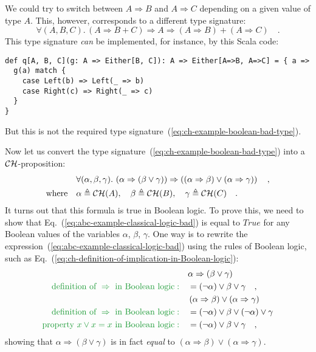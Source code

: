 We could try to switch between $A\Rightarrow B$ and $A\Rightarrow C$
depending on a given value of type $A$. This, however, corresponds
to a different type signature: 
\[
\forall(A,B,C).\,\left(A\Rightarrow B+C\right)\Rightarrow A\Rightarrow\left(A\Rightarrow B\right)+\left(A\Rightarrow C\right)\quad.
\]
This type signature \emph{can} be implemented, for instance, by this
Scala code:
\begin{lstlisting}
def q[A, B, C](g: A => Either[B, C]): A => Either[A=>B, A=>C] = { a =>
  g(a) match {
    case Left(b) => Left(_ => b)
    case Right(c) => Right(_ => c)
  }
}
\end{lstlisting}
But this is not the required type signature~(\ref{eq:ch-example-boolean-bad-type}).

Now let us convert the type signature~(\ref{eq:ch-example-boolean-bad-type})
into a ${\cal CH}$-proposition:
\begin{align}
 & \forall(\alpha,\beta,\gamma).\,\left(\alpha\Rightarrow\left(\beta\vee\gamma\right)\right)\Rightarrow\left(\left(\alpha\Rightarrow\beta\right)\vee\left(\alpha\Rightarrow\gamma\right)\right)\quad,\label{eq:abc-example-classical-logic-bad}\\
\text{where}\quad & \alpha\triangleq{\cal CH}(A),\quad\beta\triangleq{\cal CH}(B),\quad\gamma\triangleq{\cal CH}(C)\quad.\nonumber 
\end{align}
It turns out that this formula is true in Boolean logic. To prove
this, we need to show that Eq.~(\ref{eq:abc-example-classical-logic-bad})
is equal to $True$ for any Boolean values of the variables $\alpha$,
$\beta$, $\gamma$. One way is to rewrite the expression~(\ref{eq:abc-example-classical-logic-bad})
using the rules of Boolean logic, such as Eq.~(\ref{eq:ch-definition-of-implication-in-Boolean-logic}):
\begin{align*}
 & \alpha\Rightarrow\left(\beta\vee\gamma\right)\\
{\color{greenunder}\text{definition of }\Rightarrow\text{ in Boolean logic}:}\quad & =(\neg\alpha)\vee\beta\vee\gamma\quad,\\
 & \left(\alpha\Rightarrow\beta\right)\vee\left(\alpha\Rightarrow\gamma\right)\\
{\color{greenunder}\text{definition of }\Rightarrow\text{ in Boolean logic}:}\quad & =(\neg\alpha)\vee\beta\vee(\neg\alpha)\vee\gamma\\
{\color{greenunder}\text{property }x\vee x=x\text{ in Boolean logic}:}\quad & =(\neg\alpha)\vee\beta\vee\gamma\quad,
\end{align*}
showing that $\alpha\Rightarrow(\beta\vee\gamma)$ is in fact \emph{equal}
to $\left(\alpha\Rightarrow\beta\right)\vee\left(\alpha\Rightarrow\gamma\right)$.


